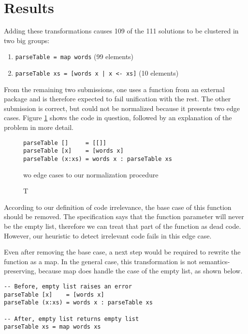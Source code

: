 \section{Results}

Adding these transformations causes 109 of the 111 solutions to be clustered in two big groups:

\begin{enumerate}
    \item \texttt{parseTable = map words} (99 elements)
    \item \texttt{parseTable xs = [words x | x <- xs]} (10 elements)
\end{enumerate}

From the remaining two submissions, one uses a function from an external package and is therefore expected to fail unification with the rest. The other submission is correct, but could not be normalized because it presents two edge cases. Figure \ref{fig:exercise1-two-edge-cases} shows the code in question, followed by an explanation of the problem in more detail.

\begin{figure}[H]
\begin{verbatim}
parseTable []     = [[]]
parseTable [x]    = [words x]
parseTable (x:xs) = words x : parseTable xs
\end{verbatim}
\caption Two edge cases to our normalization procedure
\label{fig:exercise1-two-edge-cases}
\end{figure}

According to our definition of code irrelevance, the base case of this function should be removed. The specification says that the function parameter will never be the empty list, therefore we can treat that part of the function as dead code. However, our heuristic to detect irrelevant code fails in this edge case.

Even after removing the base case, a next step would be required to rewrite the function as a map. In the general case, this transformation is not semantics-preserving, because map does handle the case of the empty list, as shown below.

\begin{verbatim}
-- Before, empty list raises an error
parseTable [x]    = [words x]
parseTable (x:xs) = words x : parseTable xs

-- After, empty list returns empty list
parseTable xs = map words xs
\end{verbatim}

